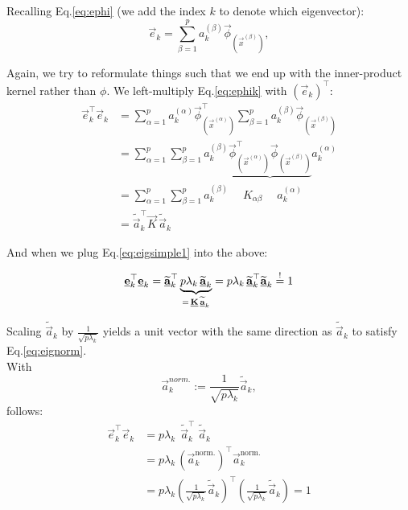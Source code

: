 \begin{enumerate}

Recalling Eq.\ref{eq:ephi} (we add the index $k$ to denote which eigenvector):
\begin{equation}
\label{eq:ephik}
\vec e_k = \sum^{p}_{\beta=1} a_k^{(\beta)} \vec{\phi}_{(\vec{x}^{(\beta)})},
\end{equation}

Again, we try to reformulate things such that we end up with the inner-product kernel rather than $\phi$. 
We left-multiply Eq.\ref{eq:ephik} with $\left(\vec e_k\right)^\top$:
\begin{align}
\vec e^{\top}_k \vec e_k &= \sum^{p}_{\alpha=1}  a_k^{(\alpha)} \vec{\phi}_{(\vec{x}^{(\alpha)})}^\top \sum^{p}_{\beta=1} a_k^{(\beta)} \vec{\phi}_{(\vec{x}^{(\beta)})} \\
&= \sum^{p}_{\alpha=1}  \sum^{p}_{\beta=1}  a_k^{(\beta)}  \underbrace{\vec{\phi}_{(\vec{x}^{(\alpha)})}^\top  \vec{\phi}_{(\vec{x}^{(\beta)})}} a_k^{(\alpha)} \\
&= \sum^{p}_{\alpha=1}  \sum^{p}_{\beta=1}  a_k^{(\beta)} \quad \; K_{\alpha\beta} \quad \; a_k^{(\alpha)} \\
&= \widetilde {\vec a}_k^\top \vec K \, \widetilde {\vec a}_k
\end{align}

And when we plug Eq.\ref{eq:eigsimple1} into the above:

\begin{equation}
\label{eq:eignorm}
\underline{\mathbf{e}}^{\top}_k \underline{\mathbf{e}}_k = 
\widetilde {\underline{\mathbf{a}}}_k^\top 
\underbrace{p \lambda_k \, \widetilde {\underline{\mathbf{a}}}_k}_{=\, \underline{\mathbf{K}} \, \widetilde {\underline{\mathbf{a}}}_k} 
= p \lambda_k \, \widetilde {\underline{\mathbf{a}}}_k^\top \widetilde {\underline{\mathbf{a}}}_k  \stackrel{\mathrm{!}}{=} 1
\end{equation}

Scaling $\widetilde {\vec a}_k$ by $\frac{1}{\sqrt{p \lambda_k}}$ yields 
a unit vector with the same direction as $\widetilde {\vec a}_k$ to satisfy Eq.\ref{eq:eignorm}.\\
With
\begin{equation}
\vec a_k^{norm.} := \frac{1}{\sqrt{p \lambda_k}} \widetilde {\vec a}_k,
\end{equation}
follows:
\begin{align}
\vec e^{\top}_k \vec e_k 
&= p \lambda_k \, \; \widetilde {\vec a}_k^\top \; \widetilde {\vec a}_k\\
&= p \lambda_k \, \left(\vec a_k^{\text{norm.}}\right)^\top \vec a_k^{\text{norm.}} \\
&= p \lambda_k \left(\frac{1}{\sqrt{p \lambda_k}} \widetilde {\vec a}_k\right)^\top \left(\frac{1}{\sqrt{p \lambda_k}} \widetilde {\vec a}_k\right)
= 1
\end{align}



\end{enumerate}
